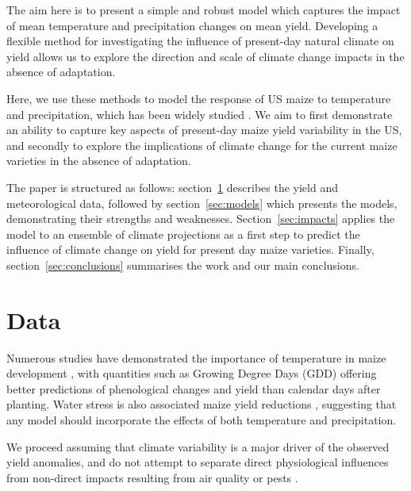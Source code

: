 \documentclass[12pt]{iopart}
\newcommand{\remove}[1]{}
\newcommand{\add}[1]{#1}
\begin{document}
The aim here is to present a simple and robust model which captures the impact of mean temperature and precipitation changes on mean yield. Developing a flexible method for investigating the influence of present-day natural climate on yield allows us to explore the direction and scale of climate change impacts in the absence of adaptation.


Here, we use these methods to model the response of US maize to temperature and precipitation, which has been widely studied \citep[e.g.][]{schlenker:2009, hatfield:2011, roberts:2012, lobell:2013, sanchez:2014, hatfield:2015, Partridge:2019}. We aim to first demonstrate an ability to capture key aspects of present-day maize yield variability in the US, and secondly to explore the implications of climate change for the current maize varieties in the absence of adaptation. 


The paper is structured as follows: section~\ref{sec:data} describes the yield and meteorological data, followed by section~\ref{sec:models} which presents the models, demonstrating their strengths and weaknesses. Section~\ref{sec:impacts} applies the model \remove{with increments in temperature and precipitation}\add{to an ensemble of climate projections} as a first step to predict the \remove{consequence}\add{influence} of climate change on \remove{agricultural}yield \add{for present day maize varieties}. Finally, section~\ref{sec:conclusions} summarises the work and our main conclusions.



\section{Data}
\label{sec:data}

\add{Numerous studies have demonstrated the importance of temperature in maize development \citep[e.g.][]{cross:1972, coelho:1980, daughtry:1984, cutforth:1990, bonhomme:1994}, with quantities such as Growing Degree Days (GDD) offering better predictions of phenological changes and yield than calendar days after planting. Water stress is also associated maize yield reductions \citep[e.g.][and references therein]{cakir:2004, ge:2012, lobell:2013, carter:2016, song:2019}, suggesting that any model should incorporate the effects of both temperature and precipitation.}

We \add{proceed} assuming that climate variability is \add{a major}\remove{the dominant} driver of the \remove{resulting}\add{observed} yield anomalies, and do not attempt to separate direct physiological influences from non-direct impacts resulting from air quality or pests \citep{Gornall:2010}.
\end{document}
